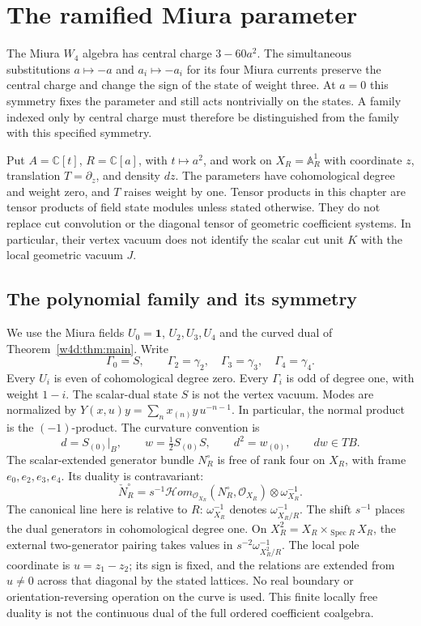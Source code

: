 \chapter{The ramified Miura parameter}
\label{rpd:chapter}

The Miura $W_4$ algebra has central charge $3-60a^2$.
The simultaneous substitutions $a\mapsto-a$ and $a_i\mapsto-a_i$
for its four Miura currents preserve the central charge and change
the sign of the state of weight three. At $a=0$ this symmetry fixes
the parameter and still
acts nontrivially on the states. A family indexed only by central
charge must therefore be distinguished from the family with this
specified symmetry.

Put $A=\mathbb C[t]$, $R=\mathbb C[a]$, with $t\mapsto a^2$, and work on
$X_R=\mathbb A^1_R$ with coordinate $z$, translation $T=\partial_z$, and
density $dz$. The parameters have cohomological degree and weight zero,
and $T$ raises weight by one. Tensor products in this chapter are tensor products of
field state modules unless stated otherwise. They do not replace cut
convolution or the diagonal tensor of geometric coefficient systems.
In particular, their vertex vacuum does not identify the scalar cut
unit $K$ with the local geometric vacuum $J$.

\section{The polynomial family and its symmetry}

We use the Miura fields $U_0=\mathbf1$, $U_2,U_3,U_4$ and the curved dual
of Theorem~\ref{w4d:thm:main}. Write
\[
 \Gamma_0=S,\qquad \Gamma_2=\gamma_2,\quad
 \Gamma_3=\gamma_3,\quad\Gamma_4=\gamma_4.
\]
Every $U_i$ is even of cohomological degree zero. Every $\Gamma_i$ is odd
of degree one, with weight $1-i$. The scalar-dual state $S$ is not the
vertex vacuum. Modes are normalized by
$Y(x,u)y=\sum_n x_{(n)}y\,u^{-n-1}$. In particular, the normal product is
the $(-1)$-product. The curvature convention is
\[
 d=S_{(0)}|_B,\qquad w=\tfrac12S_{(0)}S,
 \qquad d^2=w_{(0)},\qquad dw\in TB.
\]
The scalar-extended generator bundle $N_R^\circ$ is free of rank four
on $X_R$, with frame $e_0,e_2,e_3,e_4$. Its duality is contravariant:
\[
 \check N_R^\circ=s^{-1}\mathcal{H}om_{\mathcal O_{X_R}}(N_R^\circ,\mathcal O_{X_R})
       \otimes\omega_{X_R}^{-1}.
\]
The canonical line here is relative to $R$:
$\omega_{X_R}^{-1}$ denotes $\omega_{X_R/R}^{-1}$.
The shift $s^{-1}$ places the dual generators in cohomological degree one.
On $X_R^2=X_R\times_{\operatorname{Spec}R}X_R$, the external
two-generator pairing takes values in $s^{-2}\omega_{X_R^2/R}^{-1}$. The local pole coordinate is
$u=z_1-z_2$; its sign is fixed, and the relations are extended from
$u\ne0$ across that diagonal by the stated lattices. No real boundary
or orientation-reversing operation on the curve is used. This finite
locally free duality is not the continuous dual of the full ordered
coefficient coalgebra.

